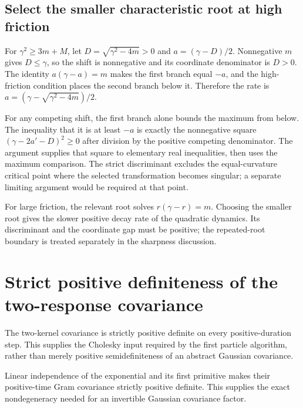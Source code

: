\documentclass[11pt,a4paper]{report}
\begin{document}
\subsection{\texorpdfstring{Select the smaller characteristic root at high friction}{Select the smaller characteristic root at high friction}}
\label{report-step-KineticLangevin-Friction-lean-5}


For \(\gamma^2\ge3m+M\), let \(D=\sqrt{\gamma^2-4m}>0\) and \(a=(\gamma-D)/2\). Nonnegative \(m\) gives \(D\le\gamma\), so the shift is nonnegative and its coordinate denominator is \(D>0\). The identity \(a(\gamma-a)=m\) makes the first branch equal \(-a\), and the high-friction condition places the second branch below it. Therefore the rate is \(a=(\gamma-\sqrt{\gamma^2-4m})/2\).



For any competing shift, the first branch alone bounds the maximum from below. The inequality that it is at least \(-a\) is exactly the nonnegative square \((\gamma-2a'-D)^2\ge0\) after division by the positive competing denominator. The argument supplies that square to elementary real inequalities, then uses the maximum comparison. The strict discriminant excludes the equal-curvature critical point where the selected transformation becomes singular; a separate limiting argument would be required at that point.



For large friction, the relevant root solves \(r(\gamma-r)=m\). Choosing the smaller root gives the slower positive decay rate of the quadratic dynamics. Its discriminant and the coordinate gap must be positive; the repeated-root boundary is treated separately in the sharpness discussion.

\section{\texorpdfstring{Strict positive definiteness of the two-response covariance}{Strict positive definiteness of the two-response covariance}}
\label{proof-module-KineticLangevin-GramPositive-lean}


The two-kernel covariance is strictly positive definite on every positive-duration step. This supplies the Cholesky input required by the first particle algorithm, rather than merely positive semidefiniteness of an abstract Gaussian covariance.



Linear independence of the exponential and its first primitive makes their positive-time Gram covariance strictly positive definite. This supplies the exact nondegeneracy needed for an invertible Gaussian covariance factor.
\end{document}
